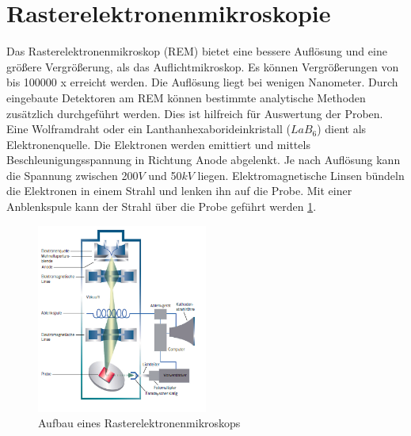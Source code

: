 \documentclass[a4paper, 11pt]{tubsreprt}
\begin{document}
\section{Rasterelektronenmikroskopie}
Das Rasterelektronenmikroskop (REM) bietet eine bessere Auflösung und eine größere Vergrößerung, als das Auflichtmikroskop. Es können Vergrößerungen von bis 100000 x erreicht werden. Die Auflösung liegt bei wenigen Nanometer. Durch eingebaute Detektoren am REM können bestimmte analytische Methoden zusätzlich  durchgeführt werden. Dies ist hilfreich für Auswertung der Proben.
Eine Wolframdraht oder ein Lanthanhexaborideinkristall ($LaB_{6}$) dient als Elektronenquelle. Die Elektronen werden emittiert und mittels Beschleunigungsspannung in Richtung Anode abgelenkt. Je nach Auflösung kann die Spannung zwischen 200$V$ und 50$kV$ liegen. Elektromagnetische Linsen bündeln die Elektronen in einem Strahl und lenken ihn auf die Probe. Mit einer Anblenkspule kann der Strahl über die Probe geführt werden \ref{REM Bild}.

\begin{figure} %
\centering
\includegraphics[width=0.5\textwidth]{Bilder/REM.png}
\caption{Aufbau eines Rasterelektronenmikroskops}
\label{REM Bild}
\end{figure}
\end{document}
